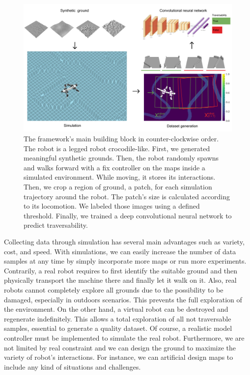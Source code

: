 \documentclass[../document.tex]{subfiles}
\begin{document}
\begin{figure} [htbp]
    \centering
        \includegraphics[width=\textwidth]{../img/method.png}
    \caption{The framework's main building block in counter-clockwise order. The robot is a legged robot crocodile-like. First, we generated meaningful synthetic grounds. Then, the robot randomly spawns and walks forward with a fix controller on the maps inside a simulated environment. While moving, it stores its interactions. Then, we crop a region of ground, a patch, for each simulation trajectory around the robot. The patch's size is calculated according to its locomotion. We labeled those images using a defined threshold. Finally, we trained a deep convolutional neural network to predict traversability. }
    \label{fig : pipeline}
    \end{figure}
Collecting data through simulation has several main advantages such as variety, cost, and speed. With simulations, we can easily increase the number of data samples at any time by simply incorporate more maps or run more experiments. Contrarily, a real robot requires to first identify the suitable ground and then physically transport the machine there and finally let it walk on it. Also, real robots cannot completely explore all grounds due to the possibility to be damaged, especially in outdoors scenarios. This prevents the full exploration of the environment. On the other hand, a virtual robot can be destroyed and regenerate indefinitely. This allows a total exploration of all not traversable samples, essential to generate a quality dataset. Of course, a realistic model controller must be implemented to simulate the real robot. Furthermore, we are not limited by real constraint and we can design the ground to maximize the variety of robot's interactions. For instance, we can artificial design maps to include any kind of situations and challenges.
\end{document}
